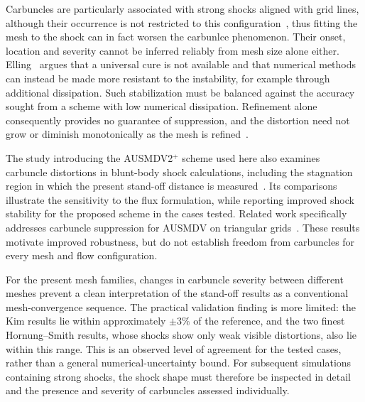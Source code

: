 Carbuncles are particularly associated with strong shocks aligned with grid
lines, although their occurrence is not restricted to this
configuration~\citep{Elling2009CarbuncleIncurable,PhongthanapanichMatthujak2021AUSMDV2Plus}, thus fitting the mesh to the shock can in fact worsen the carbunlce phenomenon.
Their onset, location and severity cannot be inferred reliably from mesh size
alone either. Elling~\citep{Elling2009CarbuncleIncurable} argues that a
universal cure is not available and that numerical methods can instead be made
more resistant to the instability, for example through additional dissipation.
Such stabilization must be balanced against the accuracy sought from a scheme
with low numerical dissipation. Refinement alone consequently provides no
guarantee of suppression, and the distortion need not grow or diminish
monotonically as the mesh is refined~\citep{Elling2009CarbuncleIncurable}.
\par\medskip

The study introducing the AUSMDV2\(^+\) scheme used here also examines
carbuncle distortions in blunt-body shock calculations, including the
stagnation region in which the present stand-off distance is
measured~\citep{PhongthanapanichMatthujak2021AUSMDV2Plus}. Its comparisons
illustrate the sensitivity to the flux formulation, while reporting improved
shock stability for the proposed scheme in the cases tested. Related work
specifically addresses carbuncle suppression for AUSMDV on triangular
grids~\citep{Phongthanapanich2016CarbuncleHealing}. These results motivate
improved robustness, but do not establish freedom from carbuncles for every
mesh and flow configuration.
\par\medskip

For the present mesh families, changes in carbuncle severity between different meshes prevent a clean interpretation of the stand-off results as a conventional mesh-convergence
sequence. The practical validation finding is more limited:
the Kim results lie within approximately \(\pm3\%\) of the reference, and
the two finest Hornung--Smith results, whose shocks show only weak visible
distortions, also lie within this range. This is an observed level of agreement
for the tested cases, rather than a general numerical-uncertainty bound.
For subsequent simulations containing strong shocks, the shock shape must
therefore be inspected in detail and the presence and severity of carbuncles
assessed individually.